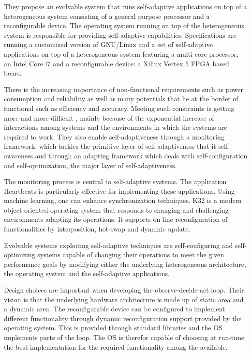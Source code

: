 
They propose an evolvable system that runs self-adaptive applications on top of a heterogeneous system consisting of a general purpose processor and a reconfigurable device. The operating system running on top of the heterogeneous system is responsible for providing self-adaptive capabilities. Specifications are running a customized version of GNU/Linux and a set of self-adaptive applications on top of a heterogeneous system featuring a multi-core processor, an Intel Core i7 and a reconfigurable device: a Xilinx Vertex 5 FPGA based board.

There is the increasing importance of non-functional requirements such as power consumption and reliability as well as many potentials that lie at the border of functional such as efficiency and accuracy. Meeting such constraints is getting more and more difficult , mainly because of the exponential increase of interactions among systems and the environments in which the systems are required to work. They also enable self-adaptiveness through a monitoring framework, which tackles the primitive layer of self-adaptiveness that it self-awareness and through an adapting framework which deals with self-configuration and self-optimization, the major layer of self-adaptiveness.

The monitoring process is central to self-adaptive systems. The application Heartbeats is particularly effective for implementing these applications. Using machine learning, one can enhance synchronization techniques. K32 is a modern object-oriented operating system that responds to changing and challenging environments adapting its operations. It supports on line reconfiguration of functionalities by interposition, hot-swap and dynamic update.

Evolvable systems exploiting self-adaptive techniques are self-configuring and self-optimizing systems capable of changing their operations to meet the given performance goals by modifying either the underlying heterogeneous architecture, the operating system and the self-adaptive applications.

Design choices are important when developing the observe-decide-act loop. Their vision is that the underlying hardware architecture is made up of  static area and a dynamic area. The reconfigurable device can be configured to implement different functionality through dynamic reconfiguration support provided by the operating system. This is provided through standard libraries and the OS implements parts of the loop. The OS is therefor capable of choosing at run-time the best implementation for the required functionality among the available.

